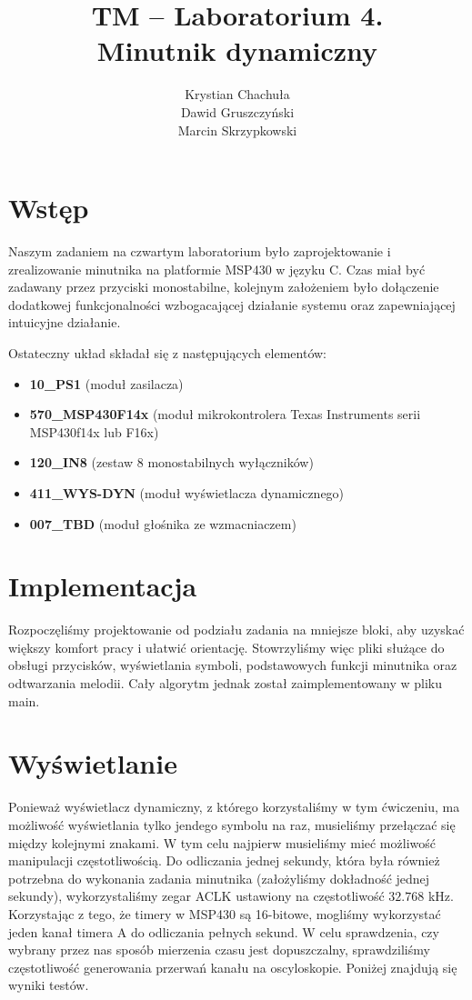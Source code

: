 \documentclass[fleqn]{article}
\title{TM -- Laboratorium 4. \\ \large Minutnik dynamiczny}
\author{Krystian Chachuła \\ Dawid Gruszczyński \\ Marcin Skrzypkowski}
\begin{document}
\maketitle

\setcounter{page}{0}
\thispagestyle{empty}

\pagebreak

\setcounter{page}{1}

\section{Wstęp}

Naszym zadaniem na czwartym laboratorium było zaprojektowanie i zrealizowanie minutnika na platformie MSP430 w języku C. Czas miał być zadawany przez przyciski monostabilne, kolejnym założeniem było dołączenie dodatkowej funkcjonalności wzbogacającej działanie systemu oraz zapewniającej intuicyjne działanie.

Ostateczny układ składał się z następujących elementów:

\begin{itemize}
	\item \textbf{10\_PS1} (moduł zasilacza)
	\item \textbf{570\_MSP430F14x} (moduł mikrokontrolera Texas Instruments serii MSP430f14x lub F16x)
	\item \textbf{120\_IN8} (zestaw 8 monostabilnych wyłączników)
	\item \textbf{411\_WYS-DYN} (moduł wyświetlacza dynamicznego)
	\item \textbf{007\_TBD} (moduł głośnika ze wzmacniaczem)
\end{itemize}

\section{Implementacja}

Rozpoczęliśmy projektowanie od podziału zadania na mniejsze bloki, aby uzyskać większy komfort pracy i ułatwić orientację. Stowrzyliśmy więc pliki służące do obsługi przycisków, wyświetlania symboli, podstawowych funkcji minutnika oraz odtwarzania melodii. Cały algorytm jednak został zaimplementowany w pliku main.


\section{Wyświetlanie}

Ponieważ wyświetlacz dynamiczny, z którego korzystaliśmy w tym ćwiczeniu, ma możliwość wyświetlania tylko jendego symbolu na raz, musieliśmy przełączać się między kolejnymi znakami. W tym celu najpierw musieliśmy mieć możliwość manipulacji częstotliwością. Do odliczania jednej sekundy, która była również potrzebna do wykonania zadania minutnika (założyliśmy dokładność jednej sekundy), wykorzystaliśmy zegar ACLK ustawiony na częstotliwość $32.768$ kHz. Korzystając z tego, że timery w MSP430 są 16-bitowe, mogliśmy wykorzystać jeden kanał timera A do odliczania pełnych sekund. W celu sprawdzenia, czy wybrany przez nas sposób mierzenia czasu jest dopuszczalny, sprawdziliśmy częstotliwość generowania przerwań kanału na oscyloskopie. Poniżej znajdują się wyniki testów.
\end{document}
